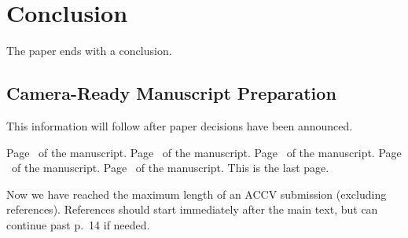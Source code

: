 \section{Conclusion}
The paper ends with a conclusion. 

\subsection{Camera-Ready Manuscript Preparation}
\label{sec:manuscript}
This information will follow after paper decisions have been announced.

\clearpage\mbox{}Page \thepage\ of the manuscript.
\clearpage\mbox{}Page \thepage\ of the manuscript.
\clearpage\mbox{}Page \thepage\ of the manuscript.
\clearpage\mbox{}Page \thepage\ of the manuscript.
\clearpage\mbox{}Page \thepage\ of the manuscript. This is the last page.
\par\vfill\par
Now we have reached the maximum length of an ACCV \ACCVyear{} submission (excluding references).
References should start immediately after the main text, but can continue past p.\ 14 if needed.
\clearpage  %

